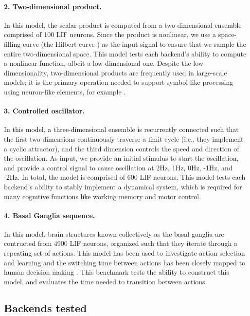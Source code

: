 \documentclass{frontiersSCNS}
\begin{document}
\paragraph{2. Two-dimensional product.}
In this model,
the scalar product is computed
from a two-dimensional ensemble
comprised of 100 LIF neurons.
Since the product is nonlinear,
we use a space-filling curve
(the Hilbert curve \cite{hilbert1891})
as the input signal to ensure that
we sample the entire two-dimensional space.
This model tests each backend's
ability to compute a nonlinear function,
albeit a low-dimensional one.
Despite the low dimensionality,
two-dimensional products are frequently used
in large-scale models;
it is the primary operation needed to support
symbol-like processing using neuron-like elements,
for example \cite{eliasmith2013}.

\paragraph{3. Controlled oscillator.}
In this model,
a three-dimensional ensemble is recurrently connected
such that the first two dimensions continuously
traverse a limit cycle
(i.e., they implement a cyclic attractor),
and the third dimension controls the speed
and direction of the oscillation.
As input, we provide an initial stimulus
to start the oscillation,
and provide a control signal
to cause oscillation at
2Hz, 1Hz, 0Hz, -1Hz, and -2Hz.
In total, the model is comprised of 600 LIF neurons.
This model tests each backend's ability
to stably implement a dynamical system,
which is required for many cognitive functions
like working memory and motor control.

\paragraph{4. Basal Ganglia sequence.}
In this model, brain structures
known collectively as the basal ganglia
are contructed from 4900 LIF neurons,
organized such that they iterate
through a repeating set of actions.
This model has been used to investigate
action selection and learning \cite{stewart2012a}
and the switching time between actions
has been closely mapped to human decision making
\cite{stewart2010}.
This benchmark tests the ability
to construct this model,
and evaluates the time needed
to transition between actions.

\subsection{Backends tested}
\end{document}
